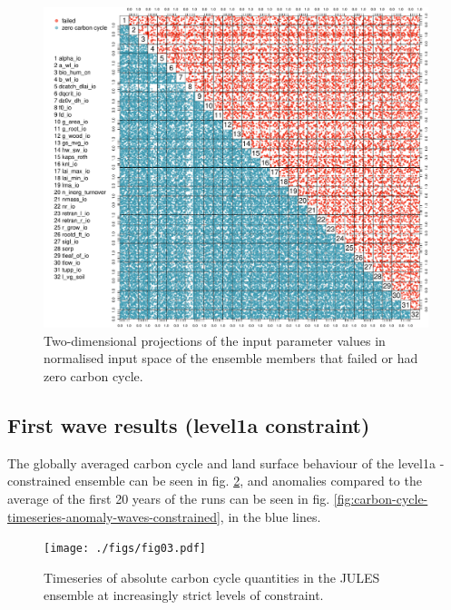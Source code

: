 \documentclass[gmd, manuscript]{copernicus}
\begin{document}


\begin{figure}[t]
\includegraphics[width=12cm]{./figs/fig02.pdf}
\caption{Two-dimensional projections of the input parameter values in normalised input space of the ensemble members that failed or had zero carbon cycle.}
\label{fig:run-failure-pairs}
\end{figure}


\subsection{First wave results (level1a constraint)}\label{sssec:level1a}

The globally averaged carbon cycle and land surface behaviour of the level1a - constrained ensemble can be seen in fig. \ref{fig:carbon-cycle-timeseries-waves-constrained}, and anomalies compared to the average of the first 20 years of the runs can be seen in fig. \ref{fig:carbon-cycle-timeseries-anomaly-waves-constrained}, in the blue lines.

\begin{figure}[t]
\texttt{[image: ./figs/fig03.pdf]}
\caption{Timeseries of absolute carbon cycle quantities in the JULES ensemble at increasingly strict levels of constraint.}
\label{fig:carbon-cycle-timeseries-waves-constrained}
\end{figure}
\end{document}
